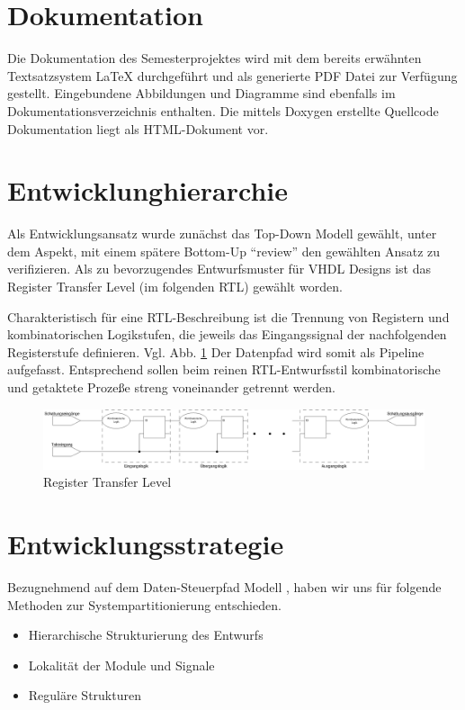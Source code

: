 \documentclass{article}
\begin{document}
\section{Dokumentation}
Die Dokumentation des Semesterprojektes wird mit dem bereits erwähnten Textsatzsystem LaTeX
durchgeführt und als generierte PDF Datei zur Verfügung gestellt. Eingebundene Abbildungen und 
Diagramme sind ebenfalls im Dokumentationsverzeichnis enthalten.
Die mittels Doxygen erstellte Quellcode Dokumentation liegt als HTML-Dokument vor.


\section{Entwicklunghierarchie}
Als Entwicklungsansatz wurde zunächst das Top-Down Modell gewählt, unter dem Aspekt, mit einem
spätere Bottom-Up "`review"' den gewählten Ansatz zu verifizieren. Als zu bevorzugendes Entwurfsmuster
für VHDL Designs ist das Register Transfer Level (im folgenden RTL) gewählt worden.

Charakteristisch für eine RTL-Beschreibung ist die Trennung von Registern und kombinatorischen
Logikstufen, die jeweils das Eingangssignal der nachfolgenden Registerstufe definieren. Vgl. Abb.
\ref{fig:RTL-Logic} Der Datenpfad wird somit als Pipeline aufgefasst. Entsprechend sollen beim reinen RTL-Entwurfsstil 
kombinatorische und getaktete Prozeße streng voneinander getrennt werden.

\begin{figure}[here]
	\begin{center}
		\includegraphics[width=0.65 \textwidth]{includes/RTL-Logic.eps}
		\caption[Darstellung RTL]{Register Transfer Level}
		\label{fig:RTL-Logic}
	\end{center}
\end{figure}

\newpage
\section{Entwicklungsstrategie}
Bezugnehmend auf dem Daten-Steuerpfad Modell \cite{Reichardt}, 
haben wir uns für folgende Methoden zur Systempartitionierung entschieden.

\begin{itemize}
  \item Hierarchische Strukturierung des Entwurfs
  \item Lokalität der Module und Signale
  \item Reguläre Strukturen
\end{itemize}
\end{document}

